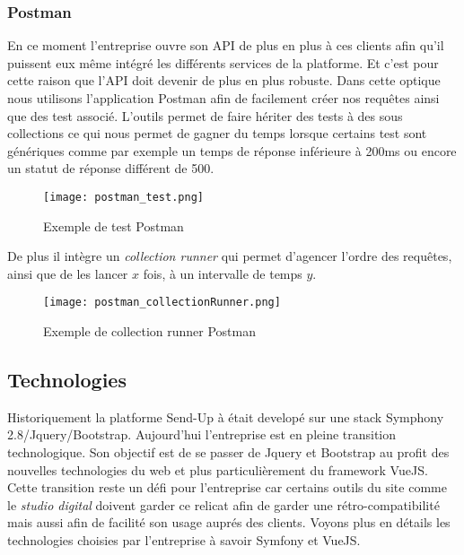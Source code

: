 \subsubsection{Postman}

En ce moment l'entreprise ouvre son API de plus en plus à ces clients afin qu'il puissent eux même intégré les différents services de la platforme. Et c'est pour cette raison que l'API doit devenir de plus en plus robuste. Dans cette optique nous utilisons l'application Postman afin de facilement créer nos requêtes ainsi que des test associé. L'outils permet de faire hériter des tests à des sous collections ce qui nous permet de gagner du temps lorsque certains test sont génériques comme par exemple un temps de réponse inférieure à 200ms ou encore un statut de réponse différent de 500. 

\begin{figure}[htbp]
    \center
        \texttt{[image: postman\_test.png]}
        \caption{Exemple de test Postman}
\end{figure}

De plus il intègre un \textit{collection runner} qui permet d'agencer l'ordre des requêtes, ainsi que de les lancer $x$ fois, à un intervalle de temps $y$. 

\begin{figure}[htbp]
    \center
    \texttt{[image: postman\_collectionRunner.png]}
    \caption{Exemple de collection runner Postman}
\end{figure}

\subsection{Technologies}

Historiquement la platforme Send-Up à était developé sur une stack Symphony 2.8/Jquery/Bootstrap. Aujourd'hui l'entreprise est en pleine transition technologique. Son objectif est de se passer de Jquery et Bootstrap au profit des nouvelles technologies du web et plus particulièrement du framework VueJS. Cette transition reste un défi pour l'entreprise car certains outils du site comme le \textit{studio digital} doivent garder ce relicat afin de garder une rétro-compatibilité mais aussi afin de facilité son usage auprés des clients. Voyons plus en détails les technologies choisies par l'entreprise à savoir Symfony et VueJS.

